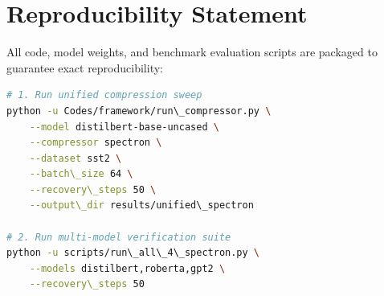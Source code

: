 \section{Reproducibility Statement}
All code, model weights, and benchmark evaluation scripts are packaged to guarantee exact reproducibility:
\begin{lstlisting}[language=bash]
# 1. Run unified compression sweep
python -u Codes/framework/run\_compressor.py \
    --model distilbert-base-uncased \
    --compressor spectron \
    --dataset sst2 \
    --batch\_size 64 \
    --recovery\_steps 50 \
    --output\_dir results/unified\_spectron

# 2. Run multi-model verification suite
python -u scripts/run\_all\_4\_spectron.py \
    --models distilbert,roberta,gpt2 \
    --recovery\_steps 50
\end{lstlisting}
